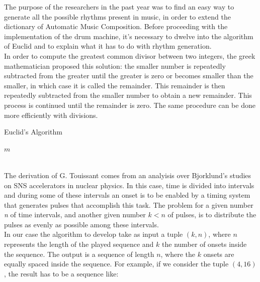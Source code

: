 \documentclass[main.tex]{subfiles}
\begin{document}
The purpose of the researchers in the past year was to find an easy way to generate all the possible rhythms present in music, in order to extend the dictionary of Automatic Music Composition\cite{Allouche:2002:AutomSeq:book}.
Before proceeding with the implementation of the drum machine, it’s necessary to dwelve into the algorithm of Euclid and to explain what it has to do with rhythm generation.\\
In order to compute the greatest common divisor between two integers, the greek mathematician proposed this solution: the smaller number is repeatedly subtracted from the greater until the greater is zero or becomes smaller than the smaller, in which case it is called the remainder. This remainder is then repeatedly subtracted from the smaller number to obtain a new remainder. This process is continued until the remainder is zero\cite{Euclid:Elements}. 
The same procedure can be done more efficiently with divisions.\\
\begin{algorithm}
\caption{Euclid's Algorithm}\label{euclid}
\begin{algorithmic}[1]
\State \Return $m$
\Else
\State {}

\EndIf
\EndProcedure
\end{algorithmic}
\end{algorithm}
\\
[10mm]
The derivation of G. Touissant\cite{Toussaint:2004:euclidean:rhythm} comes from an analyisis over Bjorklund's studies on SNS accelerators\cite{Bjorklund:2003:euclidean:rhythm} in nuclear physics. In this case, time is divided into intervals and during some of these intervals an onset is to be enabled by a timing system that generates pulses that accomplish this task. The problem for a given number \textit{n} of time intervals, and another given number \begin{math}k<n\end{math} of pulses, is to distribute the pulses as evenly as possible among these intervals.\\
In our case the algorithm to develop take as input a tuple \begin{math}{(k, n)}\end{math}, where \begin{math}{n}\end{math} represents the length of the played sequence and \begin{math}{k}\end{math} the number of onsets inside the sequence. The output is a sequence of length \begin{math}{n}\end{math}, where the \begin{math}{k}\end{math} onsets are equally spaced inside the sequence. For example, if we consider the tuple \begin{math}{(4, 16)}\end{math}, the result has to be a sequence like:\\
\end{document}
